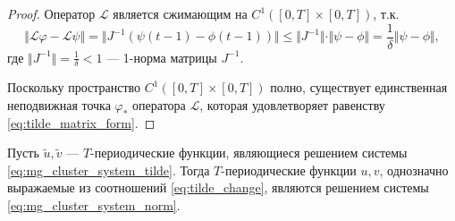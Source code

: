 \begin{proof}
	Оператор $\mathcal{L}$ является сжимающим на $C^1([0, T] \times [0, T])$, т.к.
	\[\Vert\mathcal{L}\varphi - \mathcal{L}\psi\Vert = \Vert J^{-1} (\psi(t - 1) - \phi(t - 1)) \Vert \leq \Vert J^{-1} \Vert \cdot \Vert \psi - \phi \Vert = \dfrac{1}{\delta} \Vert \psi - \phi \Vert,\]
	где $\Vert J^{-1} \Vert = \frac{1}{\delta} < 1$ --- 1-норма матрицы $J^{-1}$.
	
	Поскольку пространство $C^1([0, T] \times [0, T])$ полно, существует единственная неподвижная точка $\varphi_*$ оператора $\mathcal{L}$, которая удовлетворяет равенству \eqref{eq:tilde_matrix_form}.
\end{proof}

\begin{lemma}
	\label{lm:uv_inverse_system}
	Пусть $\tilde{u}, \tilde{v}$ --- $T$-периодические функции, являющиеся решением системы \eqref{eq:mg_cluster_system_tilde}. Тогда $T$-периодические функции $u, v$, однозначно выражаемые из соотношений \eqref{eq:tilde_change}, являются решением системы \eqref{eq:mg_cluster_system_norm}.
\end{lemma}
